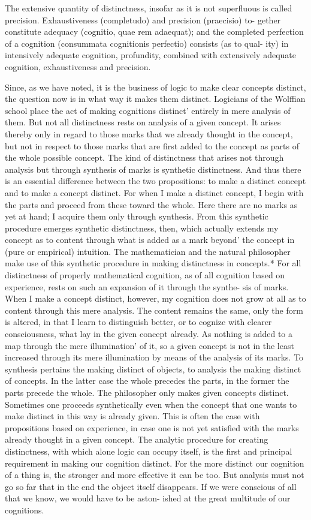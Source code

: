 The extensive quantity of distinctness, insofar as it is not superfluous is
called precision. Exhaustiveness (completudo) and precision (praecisio) to-
gether constitute adequacy (cognitio, quae rem adaequat); and the completed
perfection of a cognition (consummata cognitionis perfectio) consists (as to qual-
ity) in intensively adequate cognition, profundity, combined with extensively
adequate cognition, exhaustiveness and precision.

Since, as we have noted, it is the business of logic to make clear concepts
distinct, the question now is in what way it makes them distinct.
Logicians of the Wolffian school place the act of making cognitions
distinct' entirely in mere analysis of them. But not all distinctness rests on
analysis of a given concept. It arises thereby only in regard to those marks
that we already thought in the concept, but not in respect to those marks
that are first added to the concept as parts of the whole possible concept.
The kind of distinctness that arises not through analysis but through
synthesis of marks is synthetic distinctness. And thus there is an essential
difference between the two propositions: to make a distinct concept and to
make a concept distinct.
For when I make a distinct concept, I begin with the parts and proceed
from these toward the whole. Here there are no marks as yet at hand; I
acquire them only through synthesis. From this synthetic procedure
emerges synthetic distinctness, then, which actually extends my concept
as to content through what is added as a mark beyond' the concept in (pure
or empirical) intuition. The mathematician and the natural philosopher
make use of this synthetic procedure in making distinctness in concepts.*
For all distinctness of properly mathematical cognition, as of all cognition
based on experience, rests on such an expansion of it through the synthe-
sis of marks.
When I make a concept distinct, however, my cognition does not grow
at all as to content through this mere analysis. The content remains the
same, only the form is altered, in that I learn to distinguish better, or to
cognize with clearer consciousness, what lay in the given concept already.
As nothing is added to a map through the mere illumination' of it, so a
given concept is not in the least increased through its mere illumination
by means of the analysis of its marks.
To synthesis pertains the making distinct of objects, to analysis the
making distinct of concepts. In the latter case the whole precedes the parts, in
the former the parts precede the whole. The philosopher only makes given
concepts distinct.
Sometimes one proceeds synthetically even when the
concept that one wants to make distinct in this way is already given.
This is often the case with propositions based on experience, in case one is not
yet satisfied with the marks already thought in a given concept.
The analytic procedure for creating distinctness, with which alone logic
can occupy itself, is the first and principal requirement in making our
cognition distinct.
For the more distinct our cognition of a thing is, the
stronger and more effective it can be too.
But analysis must not go so far
that in the end the object itself disappears.
If we were conscious of all that we know, we would have to be aston-
ished at the great multitude of our cognitions.

